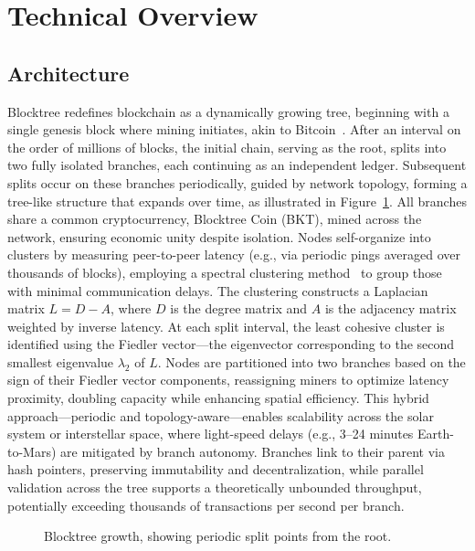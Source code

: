 \section{Technical Overview}
\subsection{Architecture}
Blocktree redefines blockchain as a dynamically growing tree, beginning with a single genesis block where mining initiates, akin to Bitcoin~\cite{nakamoto2008bitcoin}. After an interval on the order of millions of blocks, the initial chain, serving as the root, splits into two fully isolated branches, each continuing as an independent ledger. Subsequent splits occur on these branches periodically, guided by network topology, forming a tree-like structure that expands over time, as illustrated in Figure~\ref{fig:treegrowth}. All branches share a common cryptocurrency, Blocktree Coin (BKT), mined across the network, ensuring economic unity despite isolation. Nodes self-organize into clusters by measuring peer-to-peer latency (e.g., via periodic pings averaged over thousands of blocks), employing a spectral clustering method~\cite{ng2001spectral} to group those with minimal communication delays. The clustering constructs a Laplacian matrix $L = D - A$, where $D$ is the degree matrix and $A$ is the adjacency matrix weighted by inverse latency. At each split interval, the least cohesive cluster is identified using the Fiedler vector—the eigenvector corresponding to the second smallest eigenvalue $\lambda_2$ of $L$. Nodes are partitioned into two branches based on the sign of their Fiedler vector components, reassigning miners to optimize latency proximity, doubling capacity while enhancing spatial efficiency. This hybrid approach—periodic and topology-aware—enables scalability across the solar system or interstellar space, where light-speed delays (e.g., 3–24 minutes Earth-to-Mars) are mitigated by branch autonomy. Branches link to their parent via hash pointers, preserving immutability and decentralization, while parallel validation across the tree supports a theoretically unbounded throughput, potentially exceeding thousands of transactions per second per branch.

\begin{figure}[h]
\centering
{}
\caption{Blocktree growth, showing periodic split points from the root.}
\label{fig:treegrowth}
\end{figure}

